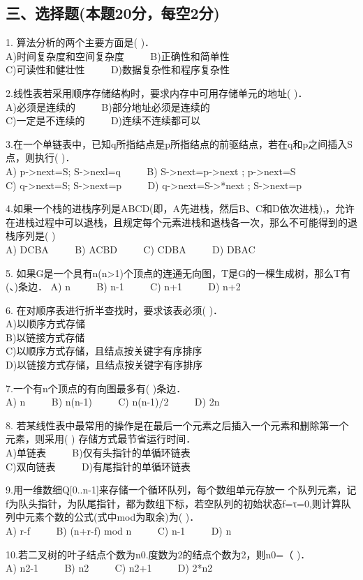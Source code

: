 \subsection{三、选择题(本题20分，每空2分)}

1. 算法分析的两个主要方面是( )． \\
A)时间复杂度和空间复杂度 $\qquad$ B)正确性和简单性 \\
C)可读性和健壮性 $\qquad$ D)数据复杂性和程序复杂性

2.线性表若采用顺序存储结构时，要求内存中可用存储单元的地址( )． \\
A)必须是连续的 $\qquad$ B)部分地址必须是连续的 \\
C)一定是不连续的 $\qquad$ D)连续不连续都可以

3.在一个单链表中，已知q所指结点是p所指结点的前驱结点，若在q和p之间插入S点，则执行( )． \\
A) p->next=S; S->nexl=q $\qquad$ B) S->next=p->next ; p->next=S \\
C) q->next=S; S->next=p $\qquad$ D) q->next=S->*next ; S->next=p

4.如果一个栈的进栈序列是ABCD(即，A先进栈，然后B、C和D依次进栈),，允许在进栈过程中可以退栈，且规定每个元素进栈和退栈各一次，那么不可能得到的退栈序列是( ) \\
A) DCBA $\qquad$ B) ACBD $\qquad$ C) CDBA $\qquad$ D) DBAC

5. 如果G是一个具有n(n>1)个顶点的连通无向图，T是G的一棵生成树，那么T有(、)条边．
A) n $\qquad$ B) n-1 $\qquad$ C) n+1 $\qquad$ D) n+2

6. 在对顺序表进行折半查找时，要求该表必须( )． \\
A)以顺序方式存储 \\
B)以链接方式存储 \\
C)以顺序方式存储，且结点按关键字有序排序 \\
D)以链接方式存储，且结点按关键字有序排序

7.一个有n个顶点的有向图最多有( )条边． \\
A) n $\qquad$ B) n(n-1) $\qquad$ C) n(n-1)/2 $\qquad$ D) 2n

8. 若某线性表中最常用的操作是在最后一个元素之后插入一个元素和删除第一个元素，则采用( ) 存储方式最节省运行时间． \\
A)单链表 $\qquad$ B)仅有头指针的单循环链表 \\
C)双向链表 $\qquad$ D)有尾指针的单循环链表

9.用一维数细Q[0..n-1]来存储一个循环队列，每个数组单元存放一 个队列元素，记f为队头指针，为队尾指针，都为数组下标，若空队列的初始状态f=τ=0,则计算队列中元素个数的公式(式中mod为取余)为( )． \\
A) r-f $\qquad$ B) (n+r-f) mod n $\qquad$ C) n-1 $\qquad$ D) n

10.若二叉树的叶子结点个数为n0.度数为2的结点个数为2，则n0=（ )． \\
A) n2-1 $\qquad$ B) n2 $\qquad$ C) n2+1 $\qquad$ D) 2*n2

